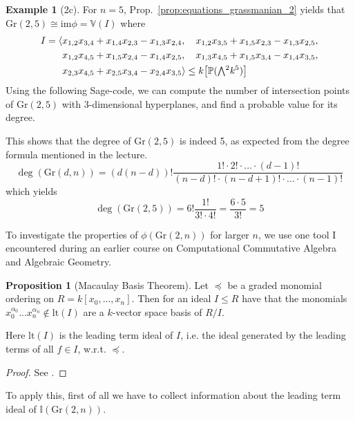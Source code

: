 \documentclass{scrartcl}
\newcommand{\I}{\mathbb{I}}
\newcommand{\V}{\mathbb{V}}
\newcommand{\Proj}{\mathbb{P}}
\newcommand{\Gr}{\mathrm{Gr}}
\newcommand{\extpow}{\mathchoice{{\textstyle\bigwedge}}
    {{\bigwedge}}
    {{\textstyle\wedge}}
    {{\scriptstyle\wedge}}}
\theoremstyle{definition}
\newtheorem{example}[definition]{Example}
\newtheorem{proposition}[definition]{Proposition}
\begin{document}
\begin{example}[2c]
    For $n = 5$, Prop.~\ref{prop:equations_grassmanian_2} yields that $\Gr(2, 5) \cong \mathrm{im}\phi = \V(I)$ where
    \begin{align*}
        I = \langle &x_{1, 2} x_{3, 4} + x_{1, 4} x_{2, 3} - x_{1, 3} x_{2, 4}, \quad x_{1, 2} x_{3, 5} + x_{1, 5} x_{2, 3} - x_{1, 3} x_{2, 5}, \\
        &x_{1, 2} x_{4, 5} + x_{1, 5} x_{2, 4} - x_{1, 4} x_{2, 5}, \quad x_{1, 3} x_{4, 5} + x_{1, 5} x_{3, 4} - x_{1, 4} x_{3, 5}, \\ 
        &x_{2, 3} x_{4, 5} + x_{2, 5} x_{3, 4} - x_{2, 4} x_{3, 5} \rangle \leq k\bigl[ \Proj(\extpow^2 k^5) \bigr]
    \end{align*}
    Using the following Sage-code, we can compute the number of intersection points of $\Gr(2, 5)$ with 3-dimensional hyperplanes, and find a probable value for its degree.
    
    This shows that the degree of $\Gr(2, 5)$ is indeed 5, as expected from the degree formula mentioned in the lecture.
    \begin{equation*}
        \deg(\Gr(d, n)) = (d(n - d))! \frac {1! \cdot 2! \cdot ... \cdot (d - 1)!} {(n - d)! \cdot (n - d + 1)! \cdot ... \cdot (n - 1)!}
    \end{equation*}
    which yields
    \begin{equation*}
        \deg(\Gr(2, 5)) = 6! \frac {1!} {3! \cdot 4!} = \frac {6 \cdot 5} {3!} = 5
    \end{equation*}
\end{example}
To investigate the properties of $\phi(\Gr(2, n))$ for larger $n$, we use one tool I encountered during an earlier course on Computational Commutative Algebra and Algebraic Geometry.
\begin{proposition}[Macaulay Basis Theorem]
    \label{prop:macaulay_basis_theorem}
    Let $\preceq$ be a graded monomial ordering on $R = k[x_0, ..., x_n]$.
    Then for an ideal $I \leq R$ have that the monomials $x_0^{\alpha_0} ... x_n^{\alpha_n} \notin \mathrm{lt}(I)$ are a $k$-vector space basis of $R/I$.

    Here $\mathrm{lt}(I)$ is the leading term ideal of $I$, i.e. the ideal generated by the leading terms of all $f \in I$, w.r.t. $\preceq$.
\end{proposition}
\begin{proof}
    See \cite{kreuzer}.
\end{proof}
To apply this, first of all we have to collect information about the leading term ideal of $\I(\Gr(2, n))$.
\end{document}
